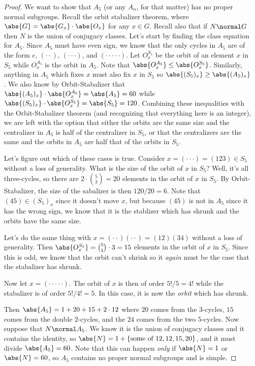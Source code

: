 \begin{proof}
We want to show that $A_5$ (or any $A_n$, for that matter) has no proper normal subgroups. Recall the orbit stabalizer theorem, where $\abs{G} = \abs{G_x} \cdot \abs{O_x}$ for any $x \in G$. Recall also that if $N \normal G$ then $N$ is the union of conjugacy classes. Let's start by finding the class equation for $A_5$. Since $A_5$ must have even sign, we know that the only cycles in $A_5$ are of the form $e$, $(\cdot \cdot)$, $(\cdot \cdot \cdot)$, and $(\cdot \cdot \cdot \cdot \cdot)$. Let $O_{x}^{S_5}$ be the orbit of an element $x$ in $S_5$ while $O_{x}^{A_5}$ is the orbit in $A_5$. Note that $\abs{O_x^{A_5}} \leq \abs{O_x^{S_5}}$. Similarly, anything in $A_5$ which fixes $x$ must also fix $x$ in $S_5$ so $\abs{(S_5)_x} \geq \abs{(A_5)_x}$. We also know by Orbit-Stabalizer that $\abs{(A_5)_x} \cdot \abs{O_x^{A_5}} = \abs{A_5} = 60$ while $\abs{(S_5)_x} \cdot \abs{O_x^{S_5}} = \abs{S_5} = 120$. Combining these inequalities with the Orbit-Stabalizer theorem (and recognizing that everything here is an integer), we are left with the option that either the orbits are the same size and the centralizer in $A_5$ is half of the centralizer in $S_5$, or that the centralizers are the same and the orbits in $A_5$ are half that of the orbits in $S_5$.

Let's figure out which of these cases is true. Consider $x = (\cdot \cdot \cdot) = (123) \in S_5$ without a loss of generality. What is the size of the orbit of $x$ in $S_5$? Well, it's all three-cycles, so there are $2 \cdot {5 \choose 3} = 20$ elements in the orbit of $x$ in $S_5$. By Orbit-Stabalizer, the size of the sabalizer is then $120/20 = 6$. Note that $(45) \in (S_5)_x$ since it doesn't move $x$, but because $(45)$ is not in $A_5$ since it has the wrong sign, we know that it is the stablizer which has shrunk and the orbits have the same size.

Let's do the same thing with $x = (\cdot \cdot)(\cdot\cdot) = (12)(34)$ without a loss of generality. Then $\abs{O_x^{S_5}} = {5 \choose 1} \cdot 3 = 15$ elements in the orbit of $x$ in $S_5$. Since this is odd, we know that the orbit can't shrink so it \emph{again} must be the case that the stabalizer has shrunk.

Now let $x = ( \cdot \cdot \cdot \cdot \cdot)$. The orbit of $x$ is then of order $5!/5 = 4!$ while the stabalizer is of order $5!/4! = 5$. In this case, it is now the \emph{orbit} which has shrunk.

Then $\abs{A_5} = 1 + 20 + 15 + 2\cdot 12$ where $20$ comes from the $3$-cycles, $15$ comes from the double $2$-cycles, and the $24$ comes from the two $5$-cycles. Now suppose that $N \normal A_5$. We know it is the union of conjugacy classes and it contains the identity, so $\abs{N} = 1 + \{\text{some of }12,12,15,20\}$, and it must divide $\abs{A_5} = 60$. Note that this can happen \emph{only} if $\abs{N} = 1$ or $\abs{N} = 60$, so $A_5$ contains no proper normal subgroups and is simple.
\end{proof}